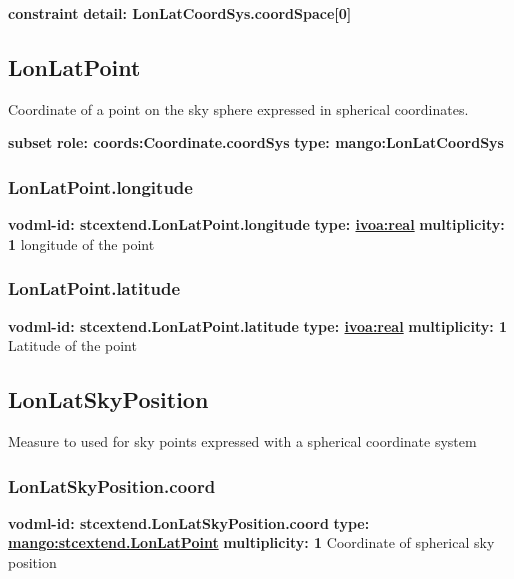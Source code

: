     \noindent \textbf{constraint} \newline
    \indent    \textbf{detail: LonLatCoordSys.coordSpace[0] }\newline


  \subsection{LonLatPoint}
  \label{sect:stcextend.LonLatPoint}
    Coordinate of a point on the sky sphere expressed in spherical coordinates.

    \noindent \textbf{subset} \newline
    \indent   \textbf{role: coords:Coordinate.coordSys} \newline
    \indent   \textbf{type: mango:LonLatCoordSys} \newline


    \subsubsection{LonLatPoint.longitude}
      \textbf{vodml-id: stcextend.LonLatPoint.longitude} \newline
      \textbf{type: \hyperref[sect:ivoa]{ivoa:real}} \newline
      \textbf{multiplicity: 1} \newline 
      longitude of the point

    \subsubsection{LonLatPoint.latitude}
      \textbf{vodml-id: stcextend.LonLatPoint.latitude} \newline
      \textbf{type: \hyperref[sect:ivoa]{ivoa:real}} \newline
      \textbf{multiplicity: 1} \newline 
      Latitude of the point

  \subsection{LonLatSkyPosition}
  \label{sect:stcextend.LonLatSkyPosition}
    Measure to used for sky points expressed with a spherical coordinate system

    \subsubsection{LonLatSkyPosition.coord}
      \textbf{vodml-id: stcextend.LonLatSkyPosition.coord} \newline
      \textbf{type: \hyperref[sect:stcextend.LonLatPoint]{mango:stcextend.LonLatPoint}} \newline
      \textbf{multiplicity: 1} \newline 
      Coordinate of spherical sky position


